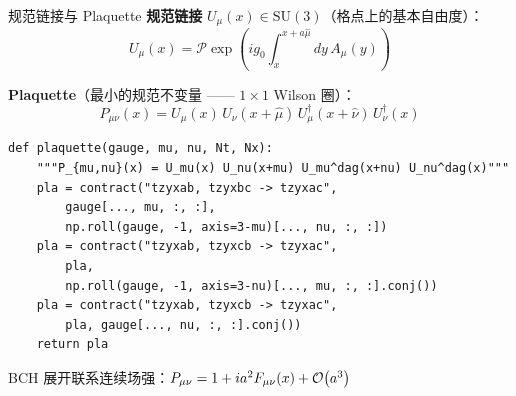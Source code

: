 \documentclass[10pt,aspectratio=169]{beamer}
\begin{document}
\begin{frame}[fragile]{规范链接与 Plaquette}
\small
\textbf{规范链接} $U_\mu(x) \in \mathrm{SU}(3)$（格点上的基本自由度）：
\begin{equation}
  U_\mu(x) = \mathcal{P}\exp\!\left(i g_0 \int_x^{x+a\hat{\mu}} dy\, A_\mu(y)\right)
\end{equation}

\textbf{Plaquette}（最小的规范不变量 —— $1\times 1$ Wilson 圈）：
\begin{equation}
  P_{\mu\nu}(x) = U_\mu(x)\,U_\nu(x+\hat{\mu})\,U_\mu^\dagger(x+\hat{\nu})\,U_\nu^\dagger(x)
\end{equation}

\begin{lstlisting}
def plaquette(gauge, mu, nu, Nt, Nx):
    """P_{mu,nu}(x) = U_mu(x) U_nu(x+mu) U_mu^dag(x+nu) U_nu^dag(x)"""
    pla = contract("tzyxab, tzyxbc -> tzyxac",
        gauge[..., mu, :, :],
        np.roll(gauge, -1, axis=3-mu)[..., nu, :, :])
    pla = contract("tzyxab, tzyxcb -> tzyxac",
        pla,
        np.roll(gauge, -1, axis=3-nu)[..., mu, :, :].conj())
    pla = contract("tzyxab, tzyxcb -> tzyxac",
        pla, gauge[..., nu, :, :].conj())
    return pla
\end{lstlisting}

BCH 展开联系连续场强：$P_{\mu\nu} = 1 + i a^2 F_{\mu\nu}(x) + \order{a^3}$
\end{frame}
\end{document}
